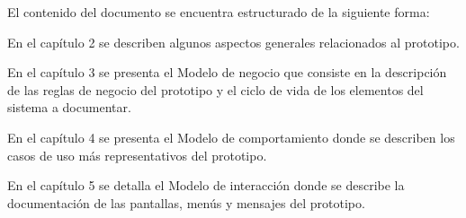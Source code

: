 El contenido del documento se encuentra estructurado de la siguiente forma:

\begin{Citemize}
	\item En el capítulo 2  se describen algunos aspectos generales relacionados al prototipo.
	\item En el capítulo 3  se presenta el Modelo de negocio que consiste en la descripción de las reglas de negocio del prototipo y el ciclo de vida de los elementos del sistema a documentar.
	\item En el capítulo 4  se presenta el Modelo de comportamiento donde se describen los casos de uso más representativos del prototipo.
	\item En el capítulo 5  se detalla el Modelo de interacción donde se describe la documentación de las pantallas, menús y mensajes del prototipo.
\end{Citemize}


